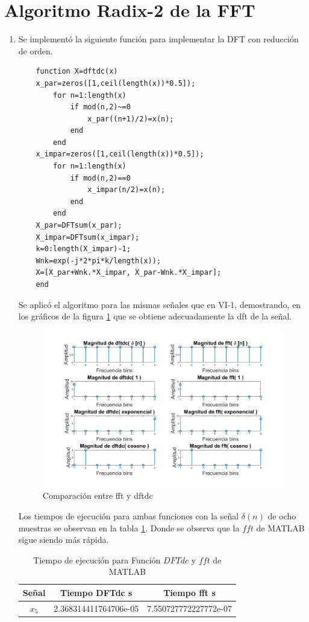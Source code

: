 \documentclass[letterpaper,onecolumn,10pt,journal,final]{IEEEtran}
\begin{document}
\section{Algoritmo Radix-2 de la FFT}
\begin{enumerate}[1)]
    \item %
    Se implementó la siguiente función para implementar la DFT con reducción de orden.
    \begin{lstlisting}
    function X=dftdc(x)
    x_par=zeros([1,ceil(length(x))*0.5]);
        for n=1:length(x)
            if mod(n,2)~=0
                x_par((n+1)/2)=x(n);
            end
        end
    x_impar=zeros([1,ceil(length(x))*0.5]);
        for n=1:length(x)
            if mod(n,2)==0
                x_impar(n/2)=x(n);
            end
        end
    X_par=DFTsum(x_par);
    X_impar=DFTsum(x_impar);
    k=0:length(X_impar)-1;
    Wnk=exp(-j*2*pi*k/length(x));
    X=[X_par+Wnk.*X_impar, X_par-Wnk.*X_impar];
    end
    \end{lstlisting}
    
    Se aplicó el algoritmo para las mismas señales que en VI-1, demostrando, en los gráficos de la figura \ref{fig:VI1} que se obtiene adecuadamente la dft de la señal.
    \begin{figure}[H]
        \centering
    \includegraphics[width= \linewidth]{Figuras/VI1.png}
        \caption{Comparación entre fft y dftdc}
        \label{fig:VI1}
    \end{figure}
    
    Los tiempos de ejecución para ambas funciones con la señal $\delta(n)$ de ocho muestras se observan en la tabla \ref{tab:5}. Donde se observa que la $fft$ de MATLAB sigue siendo más rápida.
    \begin{table}[H]
        \centering
        \begin{tabular}{|c|c|c|}
        \hline
            Señal     & Tiempo DFTdc s& Tiempo fft s \\ \hline
            $x_5$  &2.368314411764706e-05 &7.550727772227772e-07\\\hline
        \end{tabular}
        \caption{Tiempo de ejecución para Función $DFTdc$ y $fft$ de MATLAB}
        \label{tab:5}
\end{table}
    

\end{enumerate}
\end{document}

